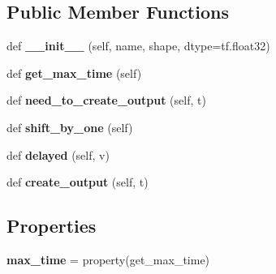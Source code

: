 \subsection*{Public Member Functions}
\begin{DoxyCompactItemize}
\item 
\mbox{\label{classmodules_1_1_time_varying_placeholder_module_aabf6878d8bd17b00fbdbe1e0a8fe9c0a}} 
def {\bfseries \+\_\+\+\_\+init\+\_\+\+\_\+} (self, name, shape, dtype=tf.\+float32)
\item 
\mbox{\label{classmodules_1_1_time_varying_placeholder_module_ac6514ecbe9d187d657fc86c071e2e756}} 
def {\bfseries get\+\_\+max\+\_\+time} (self)
\item 
\mbox{\label{classmodules_1_1_time_varying_placeholder_module_a432646952b2df102f5da026f66addf7c}} 
def {\bfseries need\+\_\+to\+\_\+create\+\_\+output} (self, t)
\item 
\mbox{\label{classmodules_1_1_time_varying_placeholder_module_a4e07fcf5b491485a38fa42dd9e2fc8c7}} 
def {\bfseries shift\+\_\+by\+\_\+one} (self)
\item 
\mbox{\label{classmodules_1_1_time_varying_placeholder_module_a8c97b431ed39651472ff304b03e04036}} 
def {\bfseries delayed} (self, v)
\item 
\mbox{\label{classmodules_1_1_time_varying_placeholder_module_a26a9bfa037aae7d52b975e27e1476ccc}} 
def {\bfseries create\+\_\+output} (self, t)
\end{DoxyCompactItemize}
\subsection*{Properties}
\begin{DoxyCompactItemize}
\item 
\mbox{\label{classmodules_1_1_time_varying_placeholder_module_af20479b3474a90c46f4bde69f2f07271}} 
{\bfseries max\+\_\+time} = property(get\+\_\+max\+\_\+time)
\end{DoxyCompactItemize}
